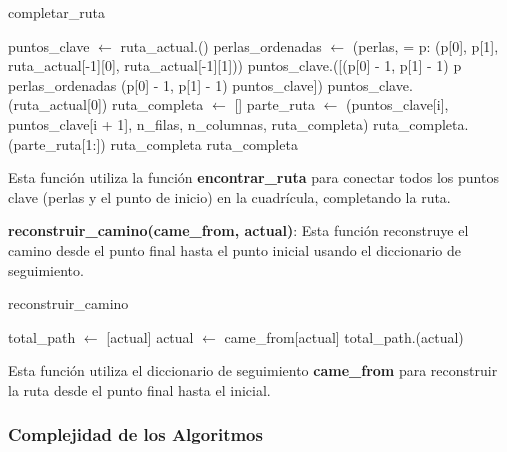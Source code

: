 \documentclass{article}
\begin{document}
\begin{algorithm}[H]
\caption{completar\_ruta}
\begin{algorithmic}[1]
        \State \Return []
    \EndIf
    \State puntos\_clave $\leftarrow$ ruta\_actual.()
    \State perlas\_ordenadas $\leftarrow$ (perlas,  =  p: (p[0], p[1], ruta\_actual[-1][0], ruta\_actual[-1][1]))
    \State puntos\_clave.([(p[0] - 1, p[1] - 1)  p  perlas\_ordenadas  (p[0] - 1, p[1] - 1)  puntos\_clave])
    \State puntos\_clave.(ruta\_actual[0])
    \State ruta\_completa $\leftarrow$ []
        \State parte\_ruta $\leftarrow$ (puntos\_clave[i], puntos\_clave[i + 1], n\_filas, n\_columnas, ruta\_completa)
            \State ruta\_completa.(parte\_ruta[1:])
        \Else
            \State \Return ruta\_completa
        \EndIf
    \EndFor
    \State \Return ruta\_completa
\EndProcedure
\end{algorithmic}
\end{algorithm}

Esta función utiliza la función \textbf{encontrar\_ruta} para conectar todos los puntos clave (perlas y el punto de inicio) en la cuadrícula, completando la ruta.

\textbf{reconstruir\_camino(came\_from, actual)}: Esta función reconstruye el camino desde el punto final hasta el punto inicial usando el diccionario de seguimiento.

\begin{algorithm}[H]
\caption{reconstruir\_camino}
\begin{algorithmic}[1]
    \State total\_path $\leftarrow$ [actual]
        \State actual $\leftarrow$ came\_from[actual]
        \State total\_path.(actual)
    \EndWhile
    \State \Return {}
\EndProcedure
\end{algorithmic}
\end{algorithm}

Esta función utiliza el diccionario de seguimiento \textbf{came\_from} para reconstruir la ruta desde el punto final hasta el inicial.

\subsubsection{Complejidad de los Algoritmos}
\end{document}
